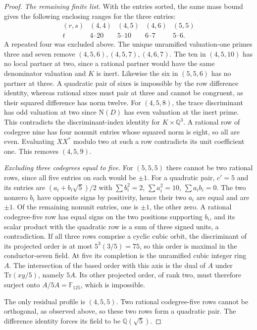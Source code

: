 \documentclass[11pt,a4paper]{article}
\numberwithin{equation}{section}
\begin{document}
\begin{proof}
\par\smallskip\noindent\emph{The remaining finite list.}\enspace
With the entries sorted, the same mass bound gives
the following enclosing ranges for the three entries:
\[
\begin{array}{c|cccc}
(r,s)&(4,4)&(4,5)&(4,6)&(5,5)\\
t&4\text{--}20&5\text{--}10&6\text{--}7&5\text{--}6 .
\end{array}
\]
A repeated four was excluded above. The unique unramified
valuation-one primes three and seven remove $(4,5,6),(4,5,7),(4,6,7)$.
The ten in $(4,5,10)$ has no local partner at two, since a rational
partner would have the same denominator valuation and $K$ is inert.
Likewise the six in $(5,5,6)$ has no partner at three. A quadratic
pair of sixes is impossible by the row difference identity, whereas
rational sixes must pair at three and cannot be congruent, as their
squared difference has norm twelve.
For $(4,5,8)$, the trace discriminant has odd valuation at two since
$\mathrm N(D)$ has even valuation at the inert prime. This contradicts
the discriminant-index identity for $K\times\mathbb Q^3$.
A rational row of codegree nine has four nonunit entries whose
squared norm is eight, so all are even. Evaluating $XX^*$ modulo
two at such a row contradicts its unit coefficient one. This removes
$(4,5,9)$.

\par\smallskip\noindent\emph{Excluding three codegrees equal to five.}\enspace
For $(5,5,5)$ there cannot be two rational rows, since all five
entries on each would be $\pm1$. For a quadratic pair,
$c'=5$ and its entries are $(a_i+b_i\sqrt5)/2$ with
$\sum b_i^2=2$, $\sum a_i^2=10$, $\sum a_ib_i=0$.
The two nonzero $b_i$ have opposite signs by positivity, hence
their two $a_i$ are equal and are $\pm1$. Of the remaining
nonunit entries, one is $\pm1$, the other zero. A rational
codegree-five row has equal signs on the two positions supporting
$b_i$, and its scalar product with the quadratic row is a sum of
three signed units, a contradiction. If all three rows comprise a
cyclic cubic orbit, the discriminant of its projected order is at
most $5^3(3/5)=75$, so this order is maximal in the conductor-seven
field. At five its completion is the unramified cubic integer ring
$A$. The intersection of the based order with this axis is the
dual of $A$ under $\mathrm{Tr}(xy/5)$, namely $5A$. Its other
projected order, of rank two, must therefore surject onto
$A/5A=\mathbb F_{125}$, which is impossible.

The only residual profile is $(4,5,5)$. Two rational codegree-five
rows cannot be orthogonal, as observed above, so these two rows form
a quadratic pair. The difference identity forces its field to be
$\mathbb Q(\sqrt5)$.
\end{proof}
\end{document}
